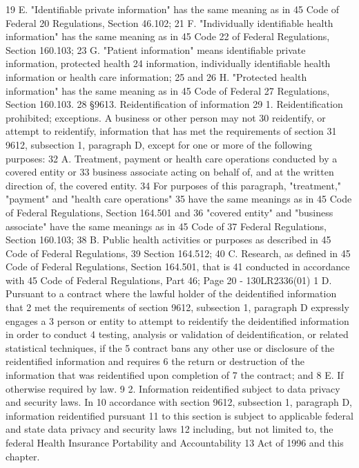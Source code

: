 19 E. "Identifiable private information" has the same meaning as in 45 Code of Federal
20 Regulations, Section 46.102;
21 F. "Individually identifiable health information" has the same meaning as in 45 Code
22 of Federal Regulations, Section 160.103;
23 G. "Patient information" means identifiable private information, protected health
24 information, individually identifiable health information or health care information;
25 and
26 H. "Protected health information" has the same meaning as in 45 Code of Federal
27 Regulations, Section 160.103.
28 §9613. Reidentification of information
29 1. Reidentification prohibited; exceptions. A business or other person may not
30 reidentify, or attempt to reidentify, information that has met the requirements of section
31 9612, subsection 1, paragraph D, except for one or more of the following purposes:
32 A. Treatment, payment or health care operations conducted by a covered entity or
33 business associate acting on behalf of, and at the written direction of, the covered entity.
34 For purposes of this paragraph, "treatment," "payment" and "health care operations"
35 have the same meanings as in 45 Code of Federal Regulations, Section 164.501 and
36 "covered entity" and "business associate" have the same meanings as in 45 Code of
37 Federal Regulations, Section 160.103;
38 B. Public health activities or purposes as described in 45 Code of Federal Regulations,
39 Section 164.512;
40 C. Research, as defined in 45 Code of Federal Regulations, Section 164.501, that is
41 conducted in accordance with 45 Code of Federal Regulations, Part 46;
Page 20 - 130LR2336(01)
1 D. Pursuant to a contract where the lawful holder of the deidentified information that
2 met the requirements of section 9612, subsection 1, paragraph D expressly engages a
3 person or entity to attempt to reidentify the deidentified information in order to conduct
4 testing, analysis or validation of deidentification, or related statistical techniques, if the
5 contract bans any other use or disclosure of the reidentified information and requires
6 the return or destruction of the information that was reidentified upon completion of
7 the contract; and
8 E. If otherwise required by law.
9 2. Information reidentified subject to data privacy and security laws. In
10 accordance with section 9612, subsection 1, paragraph D, information reidentified pursuant
11 to this section is subject to applicable federal and state data privacy and security laws
12 including, but not limited to, the federal Health Insurance Portability and Accountability
13 Act of 1996 and this chapter.
